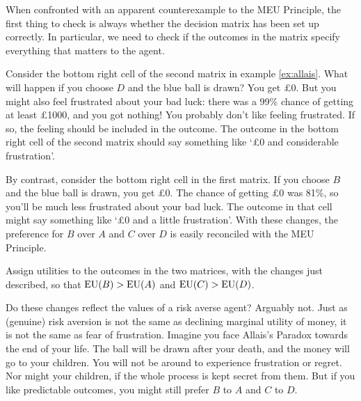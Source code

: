 When confronted with an apparent counterexample to the MEU Principle, the first
thing to check is always whether the decision matrix has been set up correctly.
In particular, we need to check if the outcomes in the matrix specify everything
that matters to the agent.


Consider the bottom right cell of the second matrix in example \ref{ex:allais}.
What will happen if you choose $D$ and the blue ball is drawn? You get £0. But
you might also feel frustrated about your bad luck: there was a 99\% chance of
getting at least £1000, and you got nothing! You probably don't like feeling
frustrated. If so, the feeling should be included in the outcome. The outcome in
the bottom right cell of the second matrix should say something like `£0 and
considerable frustration'.

By contrast, consider the bottom right cell in the first matrix. If you choose
$B$ and the blue ball is drawn, you get £0. The chance of getting £0 was
81\%, so you'll be much less frustrated about your bad luck.
The outcome in that cell might say something like `£0 and a little frustration'.
With these changes, the preference for $B$ over $A$ and $C$ over $D$ is easily
reconciled with the MEU Principle.

\begin{exercise}{1}
  Assign utilities to the outcomes in the two matrices, with the changes just
  described, so that $\text{EU}(B) > \text{EU}(A)$ and $\text{EU}(C) > \text{EU}(D)$.
\end{exercise}

Do these changes reflect the values of a risk averse agent? Arguably not. Just
as (genuine) risk aversion is not the same as declining marginal utility of
money, it is not the same as fear of frustration. Imagine you face Allais's
Paradox towards the end of your life. The ball will be drawn after your death,
and the money will go to your children. You will not be around to experience
frustration or regret. Nor might your children, if the whole process is kept
secret from them. But if you like predictable outcomes, you might still prefer
$B$ to $A$ and $C$ to $D$.

